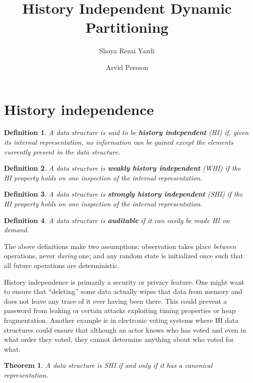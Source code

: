 \documentclass{article}
\title{History Independent Dynamic Partitioning}
\author{Shaya Rezai Yazdi \and Arvid Persson}
\newtheorem{definition}{Definition}
\newtheorem{theorem}{Theorem}
\begin{document}
\maketitle

\section{History independence}

\begin{definition}
    A data structure is said to be \textbf{history independent} (HI) if, given its internal representation, no information can be gained except the elements currently present in the data structure.
\end{definition}

\begin{definition}
    A data structure is \textbf{weakly history independent} (WHI) if the HI property holds on one inspection of the internal representation.
\end{definition}

\begin{definition}
    A data structure is \textbf{strongly history independent} (SHI) if the HI property holds on one inspection of the internal representation.
\end{definition}

\begin{definition}
    A data structure is \textbf{auditable} if it can easily be made HI on demand.
\end{definition}

The above definitions make two assumptions: observation takes place \textit{between} operations, never \textit{during} one; and any random state is initialized once such that all future operations are deterministic.

History independence is primarily a security or privacy feature. One might want to ensure that ``deleting'' some data actually wipes that data from memory and does not leave any trace of it ever having been there. This could prevent a password from leaking or certain attacks exploiting timing properties or heap fragmentation. Another example is in electronic voting systems where HI data structures could ensure that although an actor knows who has voted and even in what order they voted, they cannot determine anything about who voted for what.

\begin{theorem} \label{SHIcanon}
    A data structure is SHI if and only if it has a canonical representation.
\end{theorem}
\end{document}
